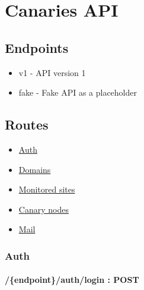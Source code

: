 \documentclass[
]{article}
\date{}
\begin{document}
\hypertarget{header-n60600}{%
\section{Canaries API}\label{header-n60600}}

\hypertarget{header-n60602}{%
\subsection{Endpoints}\label{header-n60602}}

\begin{itemize}
\item
  v1 - API version 1
\item
  fake - Fake API as a placeholder
\end{itemize}

\hypertarget{header-n60608}{%
\subsection{Routes}\label{header-n60608}}

\begin{itemize}
\item
  \protect\hyperlink{route-auth}{Auth}
\item
  \protect\hyperlink{route-domains}{Domains}
\item
  \protect\hyperlink{route-sites}{Monitored sites}
\item
  \protect\hyperlink{route-canaries}{Canary nodes}
\item
  \protect\hyperlink{route-mail}{Mail}
\end{itemize}

\hypertarget{header-n60620}{%
\subsubsection{Auth}\label{header-n60620}}

\hypertarget{header-n60621}{%
\paragraph{/\{endpoint\}/auth/login : POST}\label{header-n60621}}
\end{document}
